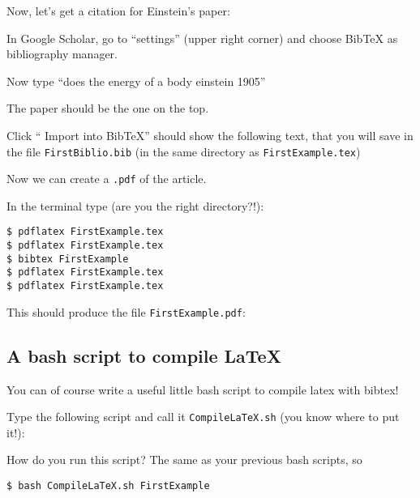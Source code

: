 

Now, let's get a citation for Einstein's paper:

\begin{compactitem}[$\quad\star$]\itemsep4pt{}
\item In Google Scholar, go to ``settings'' (upper right corner) and choose
BibTeX as bibliography manager. 
  \item Now type ``does the energy of a body einstein 1905''
  \item The paper should be the one on the top. 
  \item Click `` Import into BibTeX'' should show the following text, that you
will save in the file {\tt FirstBiblio.bib} (in the same directory as
{\tt FirstExample.tex})
{\tiny }
  \end{compactitem}

Now we can create a {\tt .pdf} of the article. 
\begin{compactitem}[$\quad\star$]\itemsep4pt{}
  \item In the terminal type (are you the right directory?!):
  \end{compactitem}

\begin{lstlisting}
$ pdflatex FirstExample.tex
$ pdflatex FirstExample.tex
$ bibtex FirstExample
$ pdflatex FirstExample.tex
$ pdflatex FirstExample.tex
\end{lstlisting}

This should produce the file {\tt FirstExample.pdf}:
    
\begin{center}
\setlength\fboxsep{0pt}
\setlength\fboxrule{0.5pt}
\end{center}

\subsection{A bash script to compile \LaTeX}

You can of course write a useful little bash script to compile latex 
with bibtex! 

Type the following script and call it {\tt CompileLaTeX.sh} (you know 
where to put it!):



How do you run this script? The same as your previous bash scripts, so 
\begin{lstlisting}	
$ bash CompileLaTeX.sh FirstExample
\end{lstlisting}

